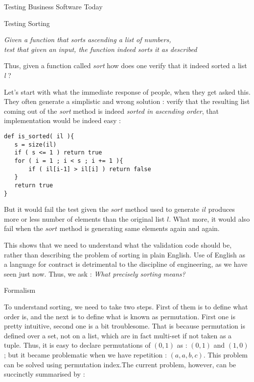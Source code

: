 \begin{section}{Testing Business Software Today}
\begin{subsection}{Testing Sorting}
\begin{center}
\emph{Given a function that sorts ascending a list of numbers,\\ test that given an input, the function indeed sorts it as described}
\end{center}


Thus, given a function called \emph{sort} how does one verify that it indeed sorted a list \emph{l} ?  

Let's start with what the immediate response of people, when they get asked this. They often generate  a  simplistic and wrong solution :  verify that the resulting list coming out of the \emph{sort} method is indeed \emph{sorted in ascending order}, that implementation would be indeed easy :

\begin{lstlisting}[style=JexlStyle]
def is_sorted( il ){
   s = size(il) 
   if ( s <= 1 ) return true 
   for ( i = 1 ; i < s ; i += 1 ){
       if ( il[i-1] > il[i] ) return false 
   }
   return true 
}
\end{lstlisting}


But it would fail the test given the $sort$ method used to generate $il$ produces more or less number of elements 
than the original list $l$. What more, it would also fail when the $sort$ method is generating same elements again and again.

This shows that we need to understand what the validation code should be, rather than describing the problem of sorting in plain English. Use of English as a language for contract is detrimental to the discipline of engineering, as we have seen just now. Thus, we ask : 
\emph{ What precisely sorting means? }

\end{subsection}

\begin{subsection}{Formalism}

To understand sorting, we need to take two steps. First of them is to define what order is, and the next is to define what is known as permutation. First one is pretty intuitive, second one is a bit troublesome. That is because permutation is defined over a set, not on a list, which are in fact multi-set if not taken as a tuple. Thus, it is easy to declare permutations of  $(0, 1)$ as : $(0,1)$ and $(1,0)$ ; but it became problematic when we have repetition : $(a,a,b,c)$.  This problem can be solved using  permutation index.The current problem, however,  can be succinctly summarised by :


\end{subsection}
\end{section}
